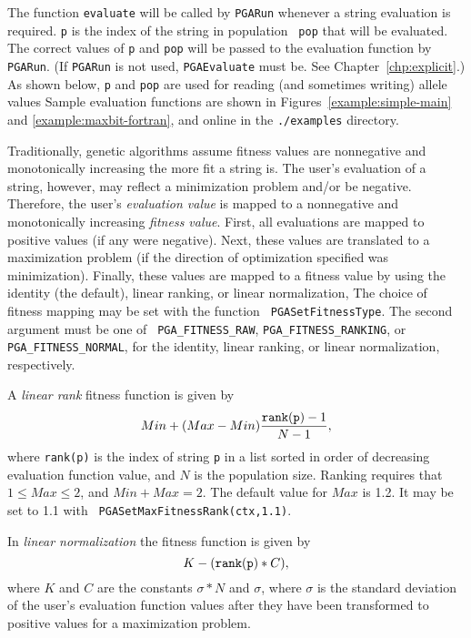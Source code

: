 \documentclass{report}
\begin{document}
The function {\tt evaluate} will be called by {\tt PGARun} whenever a string
evaluation is required.  {\tt p} is the index of the string in population {\tt
pop} that will be evaluated.  The correct values of {\tt p} and {\tt pop} will
be passed to the evaluation function by {\tt PGARun}.  (If {\tt PGARun} is not
used, {\tt PGAEvaluate} must be.  See Chapter~\ref{chp:explicit}.)
As shown below,  {\tt p}
and {\tt pop} are used for reading (and sometimes writing) allele values
Sample evaluation functions
are shown in Figures~\ref{example:simple-main} and
\ref{example:maxbit-fortran}, and online in the {\tt ./examples} directory. 

Traditionally, genetic algorithms assume fitness values are nonnegative and
monotonically increasing the more fit a string is.  The user's evaluation of a
string, however, may reflect a minimization problem and/or be negative.
Therefore, the user's {\em evaluation value} is mapped to a nonnegative and
monotonically increasing {\em fitness value}.  First, all evaluations are
mapped to positive values (if any were negative).  Next, these values are
translated to a maximization problem (if the direction of optimization
specified was minimization).  Finally, these values are mapped to a fitness
value by using the identity (the default), linear ranking, or linear
normalization, The choice of fitness mapping may be set with the function {\tt
PGASetFitnessType}.  The second argument must be one of {\tt
PGA\_FITNESS\_RAW}, {\tt PGA\_FITNESS\_RANKING}, or {\tt
PGA\_FITNESS\_NORMAL}, for the identity, linear ranking, or linear
normalization, respectively.

A {\em linear rank} fitness function \cite{Ba87,Wh89} is given by
\begin{equation}
Min + (Max - Min)\frac{{\tt rank(p)}-1}{N-1},\label{eq:rank-select}
\end{equation}
where {\tt rank(p)} is the index of string {\tt p} in a list sorted in order
of decreasing evaluation function value, and $N$ is the population size.
Ranking requires that $1 \leq Max \leq 2$, and $Min + Max = 2$.  The default
value for $Max$ is 1.2.  It may be set to 1.1 with {\tt
PGASetMaxFitnessRank(ctx,1.1)}.

In {\em linear normalization} the fitness function is given by
\begin{equation}
K - ({\tt rank(p)} * C),
\end{equation}
where $K$ and $C$ are the constants $\sigma * N$ and $\sigma$, where $\sigma$
is the standard deviation of the user's evaluation function values after they
have been transformed to positive values for a maximization problem.
\end{document}
